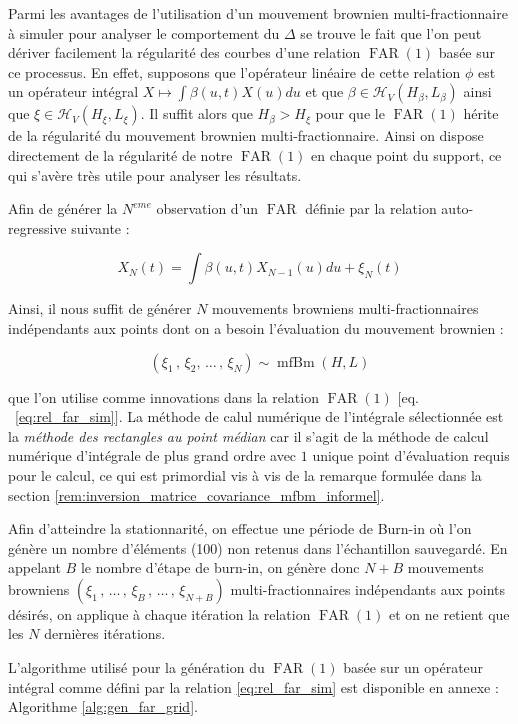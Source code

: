 
Parmi les avantages de l'utilisation d'un mouvement brownien multi-fractionnaire à simuler pour analyser le comportement du $\Delta$ se trouve le fait que l'on peut dériver facilement la régularité des courbes d'une relation $\operatorname{FAR}(1)$ basée sur ce processus. En effet, supposons que l'opérateur linéaire de cette relation $\phi$ est un opérateur intégral $X \mapsto \int \beta(u,t) X(u)du$ et que $\beta \in \mathcal H_V(H_\beta, L_\beta)$ ainsi que $\xi \in \mathcal H_V(H_\xi, L_\xi)$. Il suffit alors que $H_\beta > H_\xi$ pour que le $\operatorname{FAR}(1)$ hérite de la régularité du mouvement brownien multi-fractionnaire. Ainsi on dispose directement de la régularité de notre $\operatorname{FAR}(1)$ en chaque point du support, ce qui s'avère très utile pour analyser les résultats.

\bigskip

\noindent Afin de générer la $N^{eme}$ observation d'un $\operatorname{FAR}$ définie par la relation auto-regressive suivante :

\begin{equation}
	X_N(t) = \int \beta(u,t)X_{N-1}(u)du + \xi_N(t) \label{eq:rel_far_sim}
\end{equation}

Ainsi, il nous suffit de générer $N$ mouvements browniens multi-fractionnaires indépendants aux points dont on a besoin l'évaluation du mouvement brownien :

\begin{equation*}
	(\xi_1 \,,\, \xi_2,\, \dots \,,\, \xi_N ) \sim \operatorname{mfBm}(H, L)
\end{equation*}



\noindent que l'on utilise comme innovations dans la relation $\operatorname{FAR}(1)$ $\bigl[$eq. ~\ref{eq:rel_far_sim}$\bigr]$. La méthode de calul numérique de l'intégrale sélectionnée est la \emph{méthode des rectangles au point médian} car il s'agit de la méthode de calcul numérique d'intégrale de plus grand ordre avec $1$ unique point d'évaluation requis pour le calcul, ce qui est primordial vis à vis de la remarque formulée dans la section \ref{rem:inversion_matrice_covariance_mfbm_informel}.

\bigskip

Afin d'atteindre la stationnarité, on effectue une période de \og Burn-in \fg où l'on génère un nombre d'éléments (100) non retenus dans l'échantillon sauvegardé. En appelant $B$ le nombre d'étape de burn-in, on génère donc $N+B$ mouvements browniens $(\xi_1 \,,\, \dots \,,\,\xi_B\,,\, \dots \,, \,\xi_{N+B} )$ multi-fractionnaires indépendants aux points désirés, on applique à chaque itération la relation $\operatorname{FAR}(1)$ et on ne retient que les $N$ dernières itérations.

\bigskip

\noindent L'algorithme utilisé pour la génération du $\operatorname{FAR}(1)$ basée sur un opérateur intégral comme défini par la relation \ref{eq:rel_far_sim} est disponible en annexe : Algorithme \ref{alg:gen_far_grid}.
